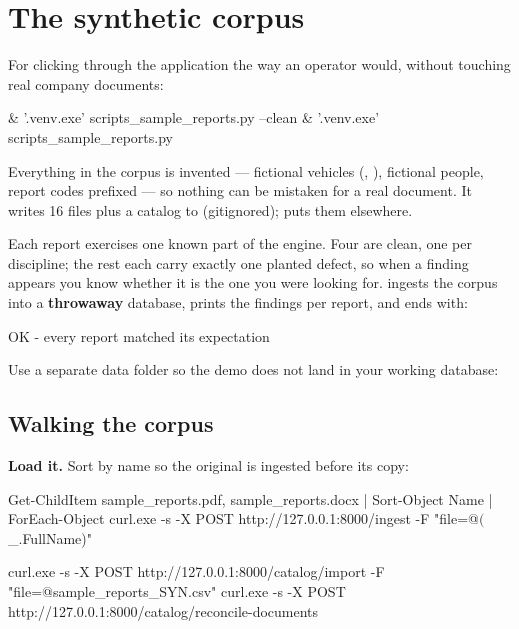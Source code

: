\section{The synthetic corpus}

For clicking through the application the way an operator would, without touching
real company documents:

\begin{shellblock}
& '.venv\Scripts\python.exe' scripts\generate_sample_reports.py --clean
& '.venv\Scripts\python.exe' scripts\verify_sample_reports.py
\end{shellblock}

Everything in the corpus is invented --- fictional vehicles (,
), fictional people, report codes prefixed  ---
so nothing can be mistaken for a real document. It writes 16 files plus a catalog
to  (gitignored);
 puts them elsewhere.

Each report exercises one known part of the engine. Four are clean, one per
discipline; the rest each carry exactly one planted defect, so when a finding
appears you know whether it is the one you were looking for.
 ingests the corpus into a \textbf{throwaway}
database, prints the findings per report, and ends with:

\begin{shellblock}
OK - every report matched its expectation
\end{shellblock}

Use a separate data folder so the demo does not land in your working database:


\subsection{Walking the corpus}

\textbf{Load it.} Sort by name so the original is ingested before its copy:

\begin{shellblock}
Get-ChildItem sample_reports\*.pdf, sample_reports\*.docx | Sort-Object Name | ForEach-Object {
  curl.exe -s -X POST http://127.0.0.1:8000/ingest -F "file=@$($_.FullName)"
}

curl.exe -s -X POST http://127.0.0.1:8000/catalog/import -F "file=@sample_reports\katalog_SYN.csv"
curl.exe -s -X POST http://127.0.0.1:8000/catalog/reconcile-documents
\end{shellblock}

